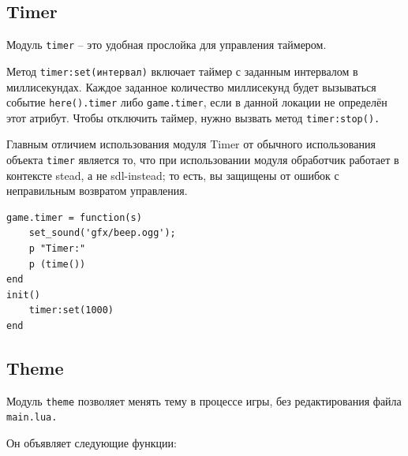 \documentclass[12pt]{article}
\begin{document}
\subsection{Timer}

Модуль \verb/timer/ -- это удобная прослойка для управления таймером.

Метод \verb/timer:set(интервал)/ включает таймер с заданным интервалом в миллисекундах. Каждое заданное количество миллисекунд будет вызываться событие \verb/here().timer/ либо \verb/game.timer/, если в данной локации не определён этот атрибут. Чтобы отключить таймер, нужно вызвать метод \verb/timer:stop()./

Главным отличием использования модуля Timer от обычного использования объекта \verb/timer/ является то, что при использовании модуля обработчик работает в контексте stead, а не sdl-instead; то есть, вы защищены от ошибок с неправильным возвратом управления.

\begin{verbatim}
game.timer = function(s)
    set_sound('gfx/beep.ogg');
    p "Timer:"
    p (time())
end
init()
    timer:set(1000)
end
\end{verbatim}

\subsection{Theme}

Модуль \verb/theme/ позволяет менять тему в процессе игры, без редактирования файла \verb/main.lua./

Он объявляет следующие функции:
\end{document}
